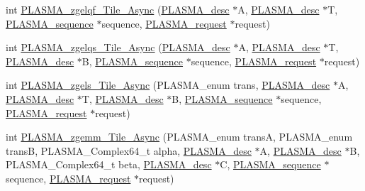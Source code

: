 \begin{DoxyCompactItemize}
\item 
int \hyperlink{group__PLASMA__Complex64__t__Tile__Async_ga045cbdfc84b025ffbf9aa8af9877a2a4_ga045cbdfc84b025ffbf9aa8af9877a2a4}{P\+L\+A\+S\+M\+A\+\_\+zgelqf\+\_\+\+Tile\+\_\+\+Async} (\hyperlink{structplasma__desc__t}{P\+L\+A\+S\+M\+A\+\_\+desc} $\ast$A, \hyperlink{structplasma__desc__t}{P\+L\+A\+S\+M\+A\+\_\+desc} $\ast$T, \hyperlink{structplasma__sequence__t}{P\+L\+A\+S\+M\+A\+\_\+sequence} $\ast$sequence, \hyperlink{structplasma__request__t}{P\+L\+A\+S\+M\+A\+\_\+request} $\ast$request)
\item 
int \hyperlink{group__PLASMA__Complex64__t__Tile__Async_gaea984817531da99d1188623a0822e5f6_gaea984817531da99d1188623a0822e5f6}{P\+L\+A\+S\+M\+A\+\_\+zgelqs\+\_\+\+Tile\+\_\+\+Async} (\hyperlink{structplasma__desc__t}{P\+L\+A\+S\+M\+A\+\_\+desc} $\ast$A, \hyperlink{structplasma__desc__t}{P\+L\+A\+S\+M\+A\+\_\+desc} $\ast$T, \hyperlink{structplasma__desc__t}{P\+L\+A\+S\+M\+A\+\_\+desc} $\ast$B, \hyperlink{structplasma__sequence__t}{P\+L\+A\+S\+M\+A\+\_\+sequence} $\ast$sequence, \hyperlink{structplasma__request__t}{P\+L\+A\+S\+M\+A\+\_\+request} $\ast$request)
\item 
int \hyperlink{group__PLASMA__Complex64__t__Tile__Async_gaef149ecf3716aec86c4da1b4ab4974f9_gaef149ecf3716aec86c4da1b4ab4974f9}{P\+L\+A\+S\+M\+A\+\_\+zgels\+\_\+\+Tile\+\_\+\+Async} (P\+L\+A\+S\+M\+A\+\_\+enum trans, \hyperlink{structplasma__desc__t}{P\+L\+A\+S\+M\+A\+\_\+desc} $\ast$A, \hyperlink{structplasma__desc__t}{P\+L\+A\+S\+M\+A\+\_\+desc} $\ast$T, \hyperlink{structplasma__desc__t}{P\+L\+A\+S\+M\+A\+\_\+desc} $\ast$B, \hyperlink{structplasma__sequence__t}{P\+L\+A\+S\+M\+A\+\_\+sequence} $\ast$sequence, \hyperlink{structplasma__request__t}{P\+L\+A\+S\+M\+A\+\_\+request} $\ast$request)
\item 
int \hyperlink{group__PLASMA__Complex64__t__Tile__Async_ga1d0c336e1fc39608832c627873b65a16_ga1d0c336e1fc39608832c627873b65a16}{P\+L\+A\+S\+M\+A\+\_\+zgemm\+\_\+\+Tile\+\_\+\+Async} (P\+L\+A\+S\+M\+A\+\_\+enum trans\+A, P\+L\+A\+S\+M\+A\+\_\+enum trans\+B, P\+L\+A\+S\+M\+A\+\_\+\+Complex64\+\_\+t alpha, \hyperlink{structplasma__desc__t}{P\+L\+A\+S\+M\+A\+\_\+desc} $\ast$A, \hyperlink{structplasma__desc__t}{P\+L\+A\+S\+M\+A\+\_\+desc} $\ast$B, P\+L\+A\+S\+M\+A\+\_\+\+Complex64\+\_\+t beta, \hyperlink{structplasma__desc__t}{P\+L\+A\+S\+M\+A\+\_\+desc} $\ast$C, \hyperlink{structplasma__sequence__t}{P\+L\+A\+S\+M\+A\+\_\+sequence} $\ast$sequence, \hyperlink{structplasma__request__t}{P\+L\+A\+S\+M\+A\+\_\+request} $\ast$request)
\item 

\end{DoxyCompactItemize}
